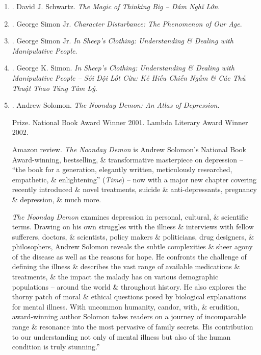\documentclass{article}
\begin{document}
\begin{enumerate}
	\item \cite{Schwartz2019}. David J. Schwartz. {\it The Magic of Thinking Big -- Dám Nghĩ Lớn}.\hfill{\sf[done]}
	\item \cite{Simon_character}. George Simon Jr. {\it Character Disturbance: The Phenomenon of Our Age}.\hfill{\sf[done]}
	\item \cite{Simon_sheep}. George Simon Jr. {\it In Sheep's Clothing: Understanding \& Dealing with Manipulative People}.\hfill{\sf[reading]}
	\item \cite{Simon_sheep_VN}. George K. Simon. {\it In Sheep's Clothing: Understanding \& Dealing with Manipulative People -- Sói Đội Lốt Cừu: Kẻ Hiếu Chiến Ngầm \& Các Thủ Thuật Thao Túng Tâm Lý}.\hfill{\sf[done]}
	\item \cite{Solomon_depression}. {\sc Andrew Solomon}. {\it The Noonday Demon: An Atlas of Depression}.\hfill{\sf[reading]}
	
	{\sf Prize.} National Book Award Winner 2001. Lambda Literary Award Winner 2002.
	
	{\sf Amazon review.} {\it The Noonday Demon} is {\sc Andrew Solomon}'s National Book Award-winning, bestselling, \& transformative masterpiece on depression -- ``the book for a generation, elegantly written, meticulously researched, empathetic, \& enlightening'' ({\it Time}) -- now with a major new chapter covering recently introduced \& novel treatments, suicide \& anti-depressants, pregnancy \& depression, \& much more.
	
	{\it The Noonday Demon} examines depression in personal, cultural, \& scientific terms. Drawing on his own struggles with the illness \& interviews with fellow sufferers, doctors, \& scientists, policy makers \& politicians, drug designers, \& philosophers, {\sc Andrew Solomon} reveals the subtle complexities \& sheer agony of the disease as well as the reasons for hope. He confronts the challenge of defining the illness \& describes the vast range of available medications \& treatments, \& the impact the malady has on various demographic populations -- around the world \& throughout history. He also explores the thorny patch of moral \& ethical questions posed by biological explanations for mental illness. With uncommon humanity, candor, with, \& erudition, award-winning author {\sc Solomon} takes readers on a journey of incomparable range \& resonance into the most pervasive of family secrets. His contribution to our understanding not only of mental illness but also of the human condition is truly stunning.''
	

\end{enumerate}
\end{document}

